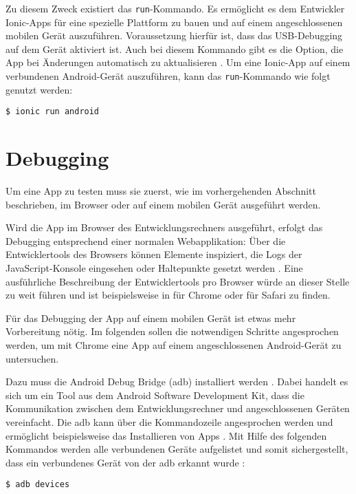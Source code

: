Zu diesem Zweck existiert das \texttt{run}-Kommando. Es ermöglicht es dem Entwickler Ionic-Apps für eine spezielle Plattform zu bauen und auf einem angeschlossenen mobilen Gerät auszuführen. Voraussetzung hierfür ist, dass das USB-Debugging auf dem Gerät aktiviert ist. Auch bei diesem Kommando gibt es die Option, die App bei Änderungen automatisch zu aktualisieren \cite{ionic:run}. Um eine Ionic-App auf einem verbundenen Android-Gerät auszuführen, kann das \texttt{run}-Kommando wie folgt genutzt werden:
\begin{codebox}
\begin{lstlisting}[style=typescript]
$ ionic run android
\end{lstlisting}
\end{codebox}

\section{Debugging}

Um eine App zu testen muss sie zuerst, wie im vorhergehenden Abschnitt beschrieben, im Browser oder auf einem mobilen Gerät ausgeführt werden. 

Wird die App im Browser des Entwicklungsrechners ausgeführt, erfolgt das Debugging entsprechend einer normalen Webapplikation: Über die Entwicklertools des Browsers können Elemente inspiziert, die Logs der JavaScript-Konsole eingesehen oder Haltepunkte gesetzt werden \cite{ionic:tips}. Eine ausführliche Beschreibung der Entwicklertools pro Browser würde an dieser Stelle zu weit führen und ist beispielsweise in \cite{google:chrome} für Chrome oder \cite{apple:safari} für Safari zu finden.

Für das Debugging der App auf einem mobilen Gerät ist etwas mehr Vorbereitung nötig. Im folgenden sollen die notwendigen Schritte angesprochen werden, um mit Chrome eine App auf einem angeschlossenen Android-Gerät zu untersuchen.

Dazu muss die Android Debug Bridge (adb) installiert werden \cite{ionic:tips}. Dabei handelt es sich um ein Tool aus dem Android Software Development Kit, dass die Kommunikation zwischen dem Entwicklungsrechner und angeschlossenen Geräten vereinfacht. Die adb kann über die Kommandozeile angesprochen werden und ermöglicht beispielsweise das Installieren von Apps \cite{google:adb}. Mit Hilfe des folgenden Kommandos werden alle verbundenen Geräte aufgelistet und somit sichergestellt, dass ein verbundenes Gerät von der adb erkannt wurde \cite{ionic:tips}:
\begin{codebox}
\begin{lstlisting}[style=typescript]
$ adb devices
\end{lstlisting}
\end{codebox}

